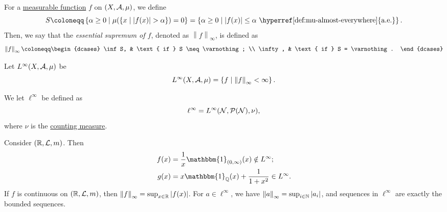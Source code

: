 \begin{definition}\label{def:essential-sumpremum}
	For a \hyperref[def:measurable-function]{measurable function} \(f\) on \((X, \mathcal{\MakeUppercase{a}} , \mu )\), we define
	\[
		S \coloneqq \left\{\alpha \geq 0\mid \mu (\{x\mid \left\vert f(x) \right\vert > \alpha \}) = 0\right\}
		= \left\{\alpha \geq 0\mid \left\vert f(x) \right\vert \leq \alpha \text{ \hyperref[def:mu-almost-everywhere]{a.e.}} \right\}.
	\]
	Then, we say that the \emph{essential supremum of \(f\)}, denoted as \(\left\lVert f\right\rVert _\infty \), is defined as
	\[
		\left\lVert f\right\rVert _\infty \coloneqq \begin{dcases}
			\inf S,  & \text{ if } S \neq \varnothing; \\
			\infty , & \text{ if } S = \varnothing.
		\end{dcases}
	\]
\end{definition}
\begin{definition}\label{def:L-infinity-space}
	Let \(L^{\infty} (X, \mathcal{\MakeUppercase{a}} , \mu )\) be
	\[
		L^{\infty} (X, \mathcal{\MakeUppercase{a}} , \mu ) = \left\{f\mid \left\lVert f\right\rVert _\infty < \infty \right\}.
	\]
\end{definition}

\begin{definition}\label{def:l-infinity-space}
	We let \(\ell ^{\infty} \) be defined as
	\[
		\ell ^{\infty} = L^{\infty} (\mathcal{\MakeUppercase{n}} , \mathcal{\MakeUppercase{p}} (\mathcal{\MakeUppercase{n}} ), \nu ),
	\]
	where \(\nu\) is the \hyperref[eg:counting-measure]{counting measure}.
\end{definition}

\begin{eg}
	Consider \((\mathbb{\MakeUppercase{r}} , \mathcal{\MakeUppercase{l}} , m)\). Then
	\[
		\begin{split}
			f(x) &= \frac{1}{x} \mathbbm{1}_{(0, \infty )} (x) \notin L^{\infty}; \\
			g(x) &= x \mathbbm{1}_{\mathbb{\MakeUppercase{q}} }(x) + \frac{1}{1 + x^{2} } \in L^{\infty}.
		\end{split}
	\]
	If \(f\) is continuous on \((\mathbb{\MakeUppercase{r}} , \mathcal{\MakeUppercase{l}} , m)\), then \(\left\lVert f\right\rVert _\infty = \sup _{x\in \mathbb{\MakeUppercase{r}} }\left\vert f(x) \right\vert \).
	For \(a\in \ell ^{\infty} \), we have \(\left\lVert a\right\rVert _\infty = \sup _{i\in \mathbb{\MakeUppercase{n}} }\left\vert a_{i}  \right\vert\), and sequences in \(\ell ^{\infty} \)
	are exactly the bounded sequences.
\end{eg}

